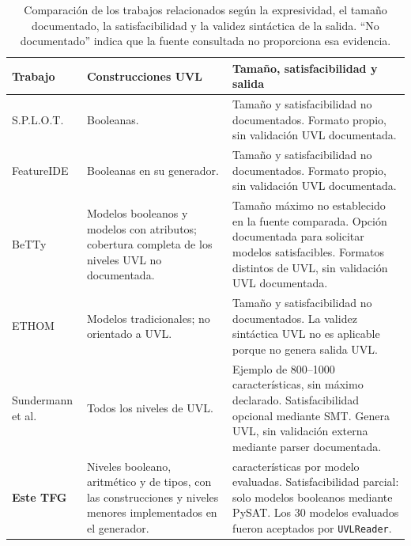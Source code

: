 \begin{table}[H]
\centering
\small
\setlength{\tabcolsep}{4pt}
\renewcommand{\arraystretch}{1.18}
\begin{tabularx}{\textwidth}{@{}
  >{\raggedright\arraybackslash}p{2.4cm}
  >{\raggedright\arraybackslash}p{3.6cm}
  >{\raggedright\arraybackslash}X
@{}}
\toprule
\textbf{Trabajo} & \textbf{Construcciones UVL} &
\textbf{Tamaño, satisfacibilidad y salida} \\
\midrule
S.P.L.O.T. \cite{splot} & Booleanas. &
Tamaño y satisfacibilidad no documentados. Formato propio, sin validación
UVL documentada. \\

FeatureIDE \cite{featureide} & Booleanas en su generador. &
Tamaño y satisfacibilidad no documentados. Formato propio, sin validación
UVL documentada. \\

BeTTy \cite{betty} &
Modelos booleanos y modelos con atributos; cobertura completa de los
niveles UVL no documentada. &
Tamaño máximo no establecido en la fuente comparada. Opción documentada
para solicitar modelos satisfacibles. Formatos distintos de UVL, sin
validación UVL documentada. \\

ETHOM \cite{ethom} & Modelos tradicionales; no orientado a UVL. &
Tamaño y satisfacibilidad no documentados. La validez sintáctica UVL no es
aplicable porque no genera salida UVL. \\

Sundermann et al. \cite{sundermann2024generating} & Todos los niveles de UVL. &
Ejemplo de 800--1000 características, sin máximo declarado. Satisfacibilidad
opcional mediante SMT. Genera UVL, sin validación externa mediante parser
documentada. \\

\midrule

\textbf{Este TFG} & Niveles booleano, aritmético y de tipos, con las construcciones y niveles menores implementados en el generador. &
100 características por modelo evaluadas. Satisfacibilidad parcial: solo
modelos booleanos mediante PySAT. Los 30 modelos evaluados fueron aceptados
por \texttt{UVLReader}. \\
\bottomrule
\end{tabularx}
\caption{Comparación de los trabajos relacionados según la expresividad,
el tamaño documentado, la satisfacibilidad y la validez sintáctica de la
salida. ``No documentado'' indica que la fuente consultada no proporciona
esa evidencia.}
\label{tab:comparativa_generadores}
\end{table}

